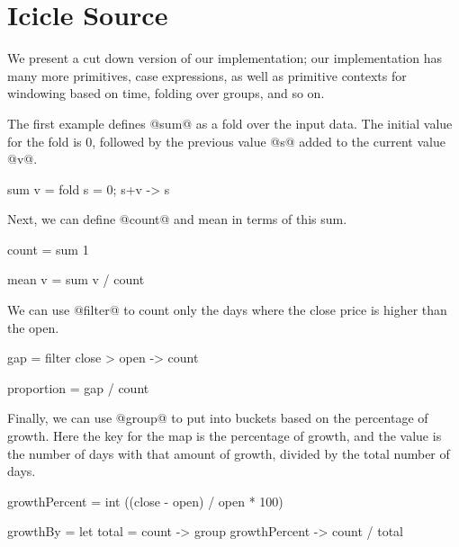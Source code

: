 \section{Icicle Source}
\label{s:Source}

We present a cut down version of our implementation; our implementation has many more primitives, case expressions, as well as primitive contexts for windowing based on time, folding over groups, and so on.

The first example defines @sum@ as a fold over the input data.
The initial value for the fold is $0$, followed by the previous value @s@ added to the current value @v@.
\begin{code}
sum v
 =  fold s = 0; s+v
 -> s
\end{code}

Next, we can define @count@ and mean in terms of this sum.
\begin{code}
count
 =  sum 1

mean v
 =  sum v / count
\end{code}

We can use @filter@ to count only the days where the close price is higher than the open.
\begin{code}
gap
 =  filter close > open
 -> count

proportion
 =  gap / count
\end{code}

Finally, we can use @group@ to put into buckets based on the percentage of growth.
Here the key for the map is the percentage of growth, and the value is the number of days with that amount of growth, divided by the total number of days.
\begin{code}
growthPercent
 =  int ((close - open) / open * 100)

growthBy
 =  let total = count
 -> group growthPercent
 -> count / total
\end{code}






